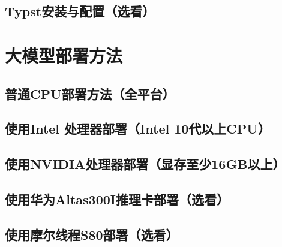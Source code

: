 \documentclass[lang=cn,a4paper,newtx]{elegantpaper}
\begin{document}
\subsection{Typst安装与配置（选看）}
\section{大模型部署方法}
\subsection{普通CPU部署方法（全平台）}
\subsection{使用Intel 处理器部署（Intel 10代以上CPU）}
\subsection{使用NVIDIA处理器部署（显存至少16GB以上）}
\subsection{使用华为Altas300I推理卡部署（选看）}
\subsection{使用摩尔线程S80部署（选看）}

\nocite{*}

\end{document}

